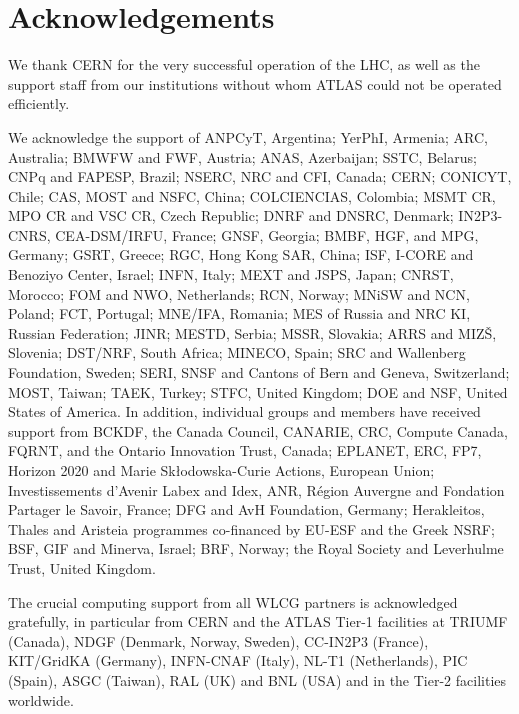 \section*{Acknowledgements}


We thank CERN for the very successful operation of the LHC, as well as the
support staff from our institutions without whom ATLAS could not be
operated efficiently.

We acknowledge the support of ANPCyT, Argentina; YerPhI, Armenia; ARC, Australia; BMWFW and FWF, Austria; ANAS, Azerbaijan; SSTC, Belarus; CNPq and FAPESP, Brazil; NSERC, NRC and CFI, Canada; CERN; CONICYT, Chile; CAS, MOST and NSFC, China; COLCIENCIAS, Colombia; MSMT CR, MPO CR and VSC CR, Czech Republic; DNRF and DNSRC, Denmark; IN2P3-CNRS, CEA-DSM/IRFU, France; GNSF, Georgia; BMBF, HGF, and MPG, Germany; GSRT, Greece; RGC, Hong Kong SAR, China; ISF, I-CORE and Benoziyo Center, Israel; INFN, Italy; MEXT and JSPS, Japan; CNRST, Morocco; FOM and NWO, Netherlands; RCN, Norway; MNiSW and NCN, Poland; FCT, Portugal; MNE/IFA, Romania; MES of Russia and NRC KI, Russian Federation; JINR; MESTD, Serbia; MSSR, Slovakia; ARRS and MIZ\v{S}, Slovenia; DST/NRF, South Africa; MINECO, Spain; SRC and Wallenberg Foundation, Sweden; SERI, SNSF and Cantons of Bern and Geneva, Switzerland; MOST, Taiwan; TAEK, Turkey; STFC, United Kingdom; DOE and NSF, United States of America. In addition, individual groups and members have received support from BCKDF, the Canada Council, CANARIE, CRC, Compute Canada, FQRNT, and the Ontario Innovation Trust, Canada; EPLANET, ERC, FP7, Horizon 2020 and Marie Sk{\l}odowska-Curie Actions, European Union; Investissements d'Avenir Labex and Idex, ANR, R{\'e}gion Auvergne and Fondation Partager le Savoir, France; DFG and AvH Foundation, Germany; Herakleitos, Thales and Aristeia programmes co-financed by EU-ESF and the Greek NSRF; BSF, GIF and Minerva, Israel; BRF, Norway; the Royal Society and Leverhulme Trust, United Kingdom.

The crucial computing support from all WLCG partners is acknowledged
gratefully, in particular from CERN and the ATLAS Tier-1 facilities at
TRIUMF (Canada), NDGF (Denmark, Norway, Sweden), CC-IN2P3 (France),
KIT/GridKA (Germany), INFN-CNAF (Italy), NL-T1 (Netherlands), PIC (Spain),
ASGC (Taiwan), RAL (UK) and BNL (USA) and in the Tier-2 facilities
worldwide.
